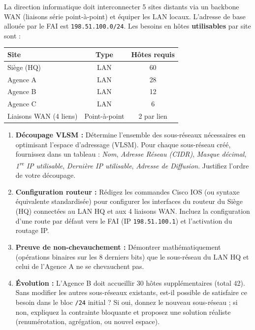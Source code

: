 \documentclass[11pt]{article}
\begin{document}
\begin{exercice}
La direction informatique doit interconnecter 5 sites distants via un backbone WAN (liaisons série point-à-point) et équiper les LAN locaux. L'adresse de base allouée par le FAI est \texttt{198.51.100.0/24}. Les besoins en hôtes \textbf{utilisables} par site sont :
\begin{center}
\begin{tabular}{|l|c|c|}
\hline \textbf{Site} & \textbf{Type} & \textbf{Hôtes requis} \\ \hline
Siège (HQ) & LAN & 60 \\ \hline
Agence A & LAN & 28 \\ \hline
Agence B & LAN & 12 \\ \hline
Agence C & LAN & 6 \\ \hline
Liaisons WAN (4 liens) & Point-à-point & 2 par lien \\ \hline
\end{tabular}
\end{center}
\begin{enumerate}
    \item \textbf{Découpage VLSM :} Détermine l'ensemble des sous-réseaux nécessaires en optimisant l'espace d'adressage (VLSM). Pour chaque sous-réseau créé, fournissez dans un tableau : \textit{Nom}, \textit{Adresse Réseau (CIDR)}, \textit{Masque décimal}, \textit{1\textsuperscript{re} IP utilisable}, \textit{Dernière IP utilisable}, \textit{Adresse de Diffusion}. Justifiez l'ordre de votre découpage.
    \item \textbf{Configuration routeur :} Rédigez les commandes Cisco IOS (ou syntaxe équivalente standardisée) pour configurer les interfaces du routeur du Siège (HQ) connectées au LAN HQ et aux 4 liaisons WAN. Incluez la configuration d'une route par défaut vers le FAI (IP \texttt{198.51.100.1}) et l'activation du routage IP.
    \item \textbf{Preuve de non-chevauchement :} Démontrer mathématiquement (opérations binaires sur les 8 derniers bits) que le sous-réseau du LAN HQ et celui de l'Agence A ne se chevauchent pas.
    \item \textbf{Évolution :} L'Agence B doit accueillir 30 hôtes supplémentaires (total 42). Sans modifier les autres sous-réseaux existants, est-il possible de satisfaire ce besoin dans le bloc \texttt{/24} initial ? Si oui, donnez le nouveau sous-réseau ; si non, expliquez la contrainte bloquante et proposez une solution réaliste (renumérotation, agrégation, ou nouvel espace).
\end{enumerate}
\end{exercice}
\end{document}
